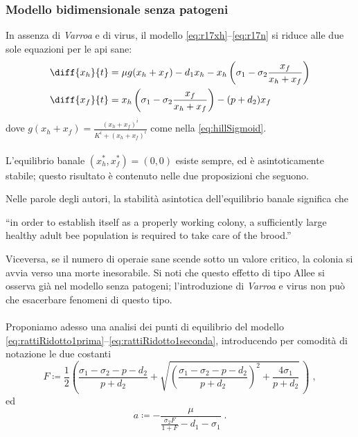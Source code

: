 \subsubsection{Modello bidimensionale senza patogeni}
In assenza di \emph{Varroa} e di virus, il modello \eqref{eq:r17xh}--\eqref{eq:r17n} si riduce alle due sole equazioni per le api sane:
\begin{align}
    \diff{x_h}{t} &= \mu g( x_h + x_f ) - d_1 x_h - x_h \left( \sigma_1 - \sigma_2 \frac{x_f}{x_h + x_f} \right)
    \label{eq:rattiRidotto1prima}
    \\
    \diff{x_f}{t} &= x_h \left( \sigma_1 - \sigma_2 \frac{x_f}{x_h + x_f} \right) - (p + d_2) x_f
    \label{eq:rattiRidotto1seconda}
\end{align}
dove $g(x_h + x_f) = \frac{ (x_h+x_f)^i }{ K^i + (x_h+x_f)^i }$ come nella \eqref{eq:hillSigmoid}.

\paragraph{}
L'equilibrio banale $(x_h^*, x_f^*) = (0,0)$ esiste sempre, ed è asintoticamente stabile; questo risultato è contenuto nelle due proposizioni che seguono.

Nelle parole degli autori, la stabilità asintotica dell'equilibrio banale significa che
\begin{displayquote}
``\omissis in order to establish itself as a properly working colony, a sufficiently large healthy adult bee population is required to take care of the brood.''
\end{displayquote}

Viceversa, se il numero di operaie sane scende sotto un valore critico, la colonia si avvia verso una morte inesorabile.
Si noti che questo effetto di tipo Allee si osserva già nel modello senza patogeni; l'introduzione di \emph{Varroa} e virus non può che esacerbare fenomeni di questo tipo.

\paragraph{}
Proponiamo adesso una analisi dei punti di equilibrio del modello \eqref{eq:rattiRidotto1prima}--\eqref{eq:rattiRidotto1seconda}, introducendo per comodità di notazione le due costanti
\begin{equation}
    F \coloneq \frac{1}{2} \left( \frac{ \sigma_1 - \sigma_2 - p - d_2 }{p+d_2} +
    \sqrt{ {\left( \frac{ \sigma_1 - \sigma_2 - p - d_2 }{p+d_2} \right)}^2 + \frac{4 \sigma_1}{p+d_2} } \, \right)
    \; ,
    \label{eq:rattiFconst}
\end{equation}
ed
\begin{equation}
 a \coloneq - \frac{ \mu }{ \frac{\sigma_2 F}{1+F} - d_1 - \sigma_1 } \; .
 \label{eq:rattiaconst}
\end{equation}

